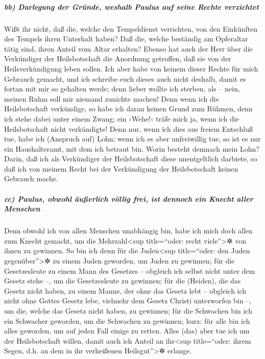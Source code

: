 \hypertarget{bb-darlegung-der-gruxfcnde-weshalb-paulus-auf-seine-rechte-verzichtet}{%
\subparagraph{bb) Darlegung der Gründe, weshalb Paulus auf seine Rechte
verzichtet}\label{bb-darlegung-der-gruxfcnde-weshalb-paulus-auf-seine-rechte-verzichtet}}

 Wißt ihr nicht, daß die, welche den Tempeldienst
verrichten, von den Einkünften des Tempels ihren Unterhalt haben? Daß
die, welche beständig am Opferaltar tätig sind, ihren Anteil vom Altar
erhalten?  Ebenso hat auch der Herr über die Verkündiger
der Heilsbotschaft die Anordnung getroffen, daß sie von der
Heilsverkündigung leben sollen.  Ich aber habe von keinem
dieser Rechte für mich Gebrauch gemacht, und ich schreibe euch dieses
auch nicht deshalb, damit es fortan mit mir so gehalten werde; denn
lieber wollte ich sterben, als -- nein, meinen Ruhm soll mir niemand
zunichte machen!  Denn wenn ich die Heilsbotschaft
verkündige, so habe ich daran keinen Grund zum Rühmen, denn ich stehe
dabei unter einem Zwang; ein ›Wehe!‹ träfe mich ja, wenn ich die
Heilsbotschaft nicht verkündigte!  Denn nur, wenn ich
dies aus freiem Entschluß tue, habe ich (Anspruch auf) Lohn; wenn ich es
aber unfreiwillig tue, so ist es nur ein Haushalteramt, mit dem ich
betraut bin.  Worin besteht demnach mein Lohn? Darin, daß
ich als Verkündiger der Heilsbotschaft diese unentgeltlich darbiete, so
daß ich von meinem Recht bei der Verkündigung der Heilsbotschaft keinen
Gebrauch mache.

\hypertarget{cc-paulus-obwohl-uxe4uuxdferlich-vuxf6llig-frei-ist-dennoch-ein-knecht-aller-menschen}{%
\subparagraph{cc) Paulus, obwohl äußerlich völlig frei, ist dennoch ein
Knecht aller
Menschen}\label{cc-paulus-obwohl-uxe4uuxdferlich-vuxf6llig-frei-ist-dennoch-ein-knecht-aller-menschen}}

 Denn obwohl ich von allen Menschen unabhängig bin, habe
ich mich doch allen zum Knecht gemacht, um die Mehrzahl\textless sup
title=``oder: recht viele''\textgreater✲ von ihnen zu gewinnen.
 So bin ich denn für die Juden\textless sup title=``oder:
den Juden gegenüber''\textgreater✲ zu einem Juden geworden, um Juden zu
gewinnen; für die Gesetzesleute zu einem Mann des Gesetzes -- obgleich
ich selbst nicht unter dem Gesetz stehe --, um die Gesetzesleute zu
gewinnen;  für die (Heiden), die das Gesetz nicht haben,
zu einem Manne, der ohne das Gesetz lebt -- obgleich ich nicht ohne
Gottes Gesetz lebe, vielmehr dem Gesetz Christi unterworfen bin --, um
die, welche das Gesetz nicht haben, zu gewinnen;  für die
Schwachen bin ich ein Schwacher geworden, um die Schwachen zu gewinnen;
kurz: für alle bin ich alles geworden, um auf jeden Fall einige zu
retten.  Alles (das) aber tue ich um der Heilsbotschaft
willen, damit auch ich Anteil an ihr\textless sup title=``oder: ihrem
Segen, d.h. an dem in ihr verheißenen Heilsgut''\textgreater✲ erlange.

